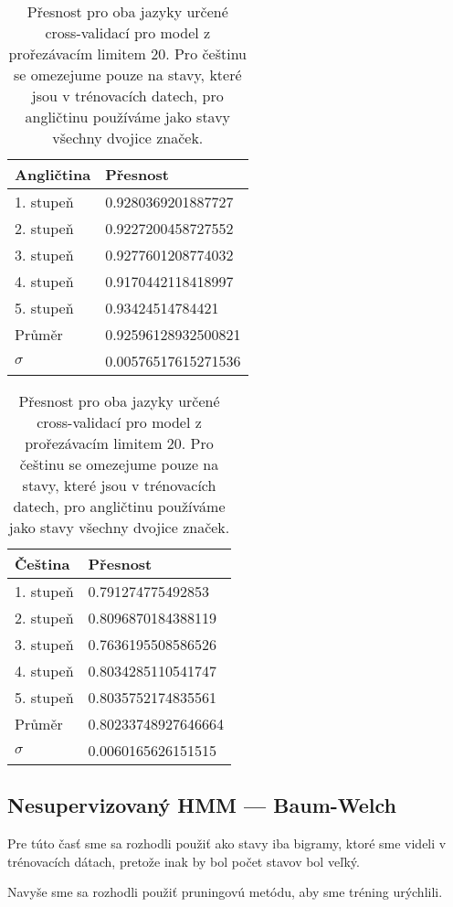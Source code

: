 \documentclass[a4paper, 10.5pt]{article}
\begin{document}
\begin{table}[H]
\centering
\begin{tabular}{ll}
\toprule
\textbf{Angličtina} & \textbf{Přesnost} \\
\midrule
1. stupeň & 0.9280369201887727 \\
2. stupeň & 0.9227200458727552 \\
3. stupeň & 0.9277601208774032 \\
4. stupeň & 0.9170442118418997 \\
5. stupeň & 0.93424514784421 \\
\midrule
Průměr   & 0.92596128932500821 \\
$\sigma$ & 0.00576517615271536 \\
\bottomrule
\end{tabular}
\hskip 50pt
\begin{tabular}{ll}
\toprule
\textbf{Čeština} & \textbf{Přesnost} \\
\midrule
1. stupeň & 0.791274775492853 \\
2. stupeň & 0.8096870184388119 \\
3. stupeň & 0.7636195508586526 \\
4. stupeň & 0.8034285110541747 \\
5. stupeň & 0.8035752174835561 \\
\midrule
Průměr   & 0.80233748927646664 \\
$\sigma$ & 0.0060165626151515 \\
\bottomrule
\end{tabular}
\caption{Přesnost pro oba jazyky určené cross-validací pro model z prořezávacím limitem 20. Pro češtinu se omezejume pouze na stavy, které jsou v trénovacích datech, pro angličtinu používáme jako stavy všechny dvojice značek.}
\end{table}

\subsection*{Nesupervizovaný HMM --- Baum-Welch}

Pre túto časť sme sa rozhodli použiť ako stavy iba bigramy, ktoré sme videli v trénovacích dátach, pretože inak by bol počet stavov bol veľký.

Navyše sme sa rozhodli použiť pruningovú metódu, aby sme tréning urýchlili.
\end{document}
